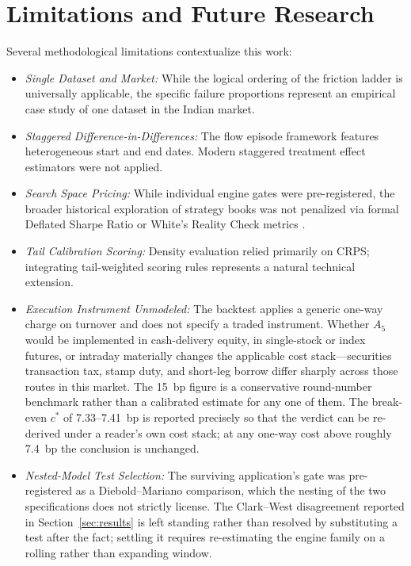 \documentclass{ieeeaccess}
\begin{document}
\section{Limitations and Future Research}
\label{sec:limitations}
Several methodological limitations contextualize this work:
\begin{itemize}
    \item \textit{Single Dataset and Market:} While the logical ordering of the friction ladder is universally applicable, the specific failure proportions represent an empirical case study of one dataset in the Indian market.
    \item \textit{Staggered Difference-in-Differences:} The flow episode framework features heterogeneous start and end dates. Modern staggered treatment effect estimators \cite{aguilarloyo2025comparative, dechaisemartin2026differenceindifferences} were not applied.
    \item \textit{Search Space Pricing:} While individual engine gates were pre-registered, the broader historical exploration of strategy books was not penalized via formal Deflated Sharpe Ratio or White's Reality Check metrics \cite{arian2024backtest, anghel2021data, hollstein2022world}.
    \item \textit{Tail Calibration Scoring:} Density evaluation relied primarily on CRPS; integrating tail-weighted scoring rules \cite{allen2025tail, arnold2024decompositions} represents a natural technical extension.
    \item \textit{Execution Instrument Unmodeled:} The backtest applies a generic one-way charge on turnover and does not specify a traded instrument. Whether $A_5$ would be implemented in cash-delivery equity, in single-stock or index futures, or intraday materially changes the applicable cost stack---securities transaction tax, stamp duty, and short-leg borrow differ sharply across those routes in this market. The 15~bp figure is a conservative round-number benchmark rather than a calibrated estimate for any one of them. The break-even $c^*$ of 7.33--7.41~bp is reported precisely so that the verdict can be re-derived under a reader's own cost stack; at any one-way cost above roughly 7.4~bp the conclusion is unchanged.
    \item \textit{Nested-Model Test Selection:} The surviving application's gate was pre-registered as a Diebold--Mariano comparison, which the nesting of the two specifications does not strictly license. The Clark--West disagreement reported in Section~\ref{sec:results} is left standing rather than resolved by substituting a test after the fact; settling it requires re-estimating the engine family on a rolling rather than expanding window.
\end{itemize}
\end{document}
